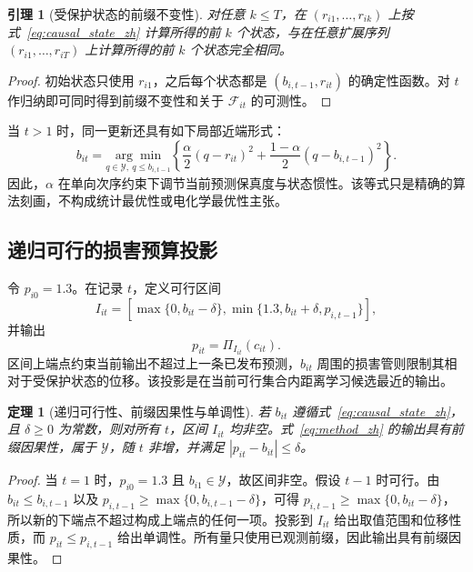 \documentclass[UTF8,11pt]{ctexart}
\newtheorem{lemma}{引理}
\newtheorem{theorem}{定理}
\begin{document}
\begin{lemma}[受保护状态的前缀不变性]
\label{lem:prefix_zh}
对任意 $k\leq T$，在 $(r_{i1},\ldots,r_{ik})$ 上按式~\eqref{eq:causal_state_zh} 计算所得的前 $k$ 个状态，与在任意扩展序列 $(r_{i1},\ldots,r_{iT})$ 上计算所得的前 $k$ 个状态完全相同。
\end{lemma}
\begin{proof}
初始状态只使用 $r_{i1}$，之后每个状态都是 $(b_{i,t-1},r_{it})$ 的确定性函数。对 $t$ 作归纳即可同时得到前缀不变性和关于 $\mathcal F_{it}$ 的可测性。
\end{proof}

当 $t>1$ 时，同一更新还具有如下局部近端形式：
\begin{equation}
  b_{it}=\underset{q\in\mathcal Y,\ q\leq b_{i,t-1}}{\arg\min}
  \left\{
  \frac{\alpha}{2}(q-r_{it})^2+
  \frac{1-\alpha}{2}(q-b_{i,t-1})^2
  \right\}.
  \label{eq:protected_proximal_zh}
\end{equation}
因此，$\alpha$ 在单向次序约束下调节当前预测保真度与状态惯性。该等式只是精确的算法刻画，不构成统计最优性或电化学最优性主张。

\subsection{递归可行的损害预算投影}

令 $p_{i0}=1.3$。在记录 $t$，定义可行区间
\begin{equation}
  I_{it}=\left[
  \max\{0,b_{it}-\delta\},
  \min\{1.3,b_{it}+\delta,p_{i,t-1}\}
  \right],
  \label{eq:feasible_interval_zh}
\end{equation}
并输出
\begin{equation}
  p_{it}=\Pi_{I_{it}}(c_{it}).
  \label{eq:method_zh}
\end{equation}
区间上端点约束当前输出不超过上一条已发布预测，$b_{it}$ 周围的损害管则限制其相对于受保护状态的位移。该投影是在当前可行集合内距离学习候选最近的输出。

\begin{theorem}[递归可行性、前缀因果性与单调性]
\label{thm:pchp_zh}
若 $b_{it}$ 遵循式~\eqref{eq:causal_state_zh}，且 $\delta\geq0$ 为常数，则对所有 $t$，区间 $I_{it}$ 均非空。式~\eqref{eq:method_zh} 的输出具有前缀因果性，属于 $\mathcal Y$，随 $t$ 非增，并满足 $|p_{it}-b_{it}|\leq\delta$。
\end{theorem}
\begin{proof}
当 $t=1$ 时，$p_{i0}=1.3$ 且 $b_{i1}\in\mathcal Y$，故区间非空。假设 $t-1$ 时可行。由 $b_{it}\leq b_{i,t-1}$ 以及 $p_{i,t-1}\geq\max\{0,b_{i,t-1}-\delta\}$，可得 $p_{i,t-1}\geq\max\{0,b_{it}-\delta\}$，所以新的下端点不超过构成上端点的任何一项。投影到 $I_{it}$ 给出取值范围和位移性质，而 $p_{it}\leq p_{i,t-1}$ 给出单调性。所有量只使用已观测前缀，因此输出具有前缀因果性。
\end{proof}
\end{document}
